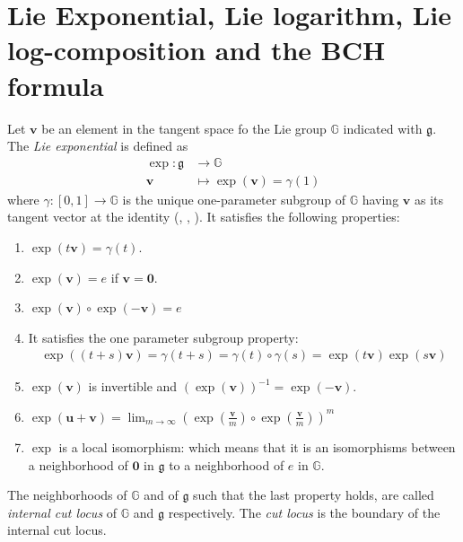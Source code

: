 \section{Lie Exponential, Lie logarithm, Lie log-composition and the BCH formula }\label{se:lie_exp_log_comp_bch}
Let $\mathbf{v}$ be an element in the tangent space fo the Lie group $\mathbb{G}$ indicated with $\mathfrak{g}$.
The \emph{Lie exponential} is defined as 
\begin{align*}
\exp :  \mathfrak{g} & \longrightarrow  \mathbb{G}  \\
\mathbf{v} &\longmapsto  \exp(\mathbf{v} ) = \gamma(1) %
\end{align*}
where $\gamma: [0,1]\rightarrow \mathbb{G} $ is the unique one-parameter subgroup of $\mathbb{G}$ having $\mathbf{v}$ as its tangent vector at the identity (\cite{do1992riemannian}, \cite{ebin2006singularities}, \cite{Arsigny:MRM:06}).
It satisfies the following properties:
\begin{enumerate}
	\item $\exp(t\mathbf{v}) =\gamma(t) $.
	\item $\exp(\mathbf{v}) = e$ if $\mathbf{v} = \mathbf{0}$.
	\item $\exp(\mathbf{v})\circ \exp(\mathbf{-v})  = e$
	\item It satisfies the one parameter subgroup property:
	\begin{align*}
	\exp((t+s)\mathbf{v}) = \gamma(t+s) = \gamma(t)\circ \gamma(s) = \exp(t\mathbf{v})\exp(s\mathbf{v})
	\end{align*}
	\item $\exp(\mathbf{v})$ is invertible and $(\exp(\mathbf{v}))^{-1} = \exp(-\mathbf{v})$.
		\item  $\exp(\mathbf{u} + \mathbf{v}) =\lim_{m\rightarrow \infty} (\exp(\frac{\mathbf{v}}{m}) \circ\exp(\frac{\mathbf{v}}{m}))^{m}$
	\item $\exp$ is a local isomorphism: which means that it is an isomorphisms between a neighborhood of $\mathbf{0}$ in $\mathfrak{g}$ to a neighborhood of $e$ in $\mathbb{G}$.
\end{enumerate}
The neighborhoods of $\mathbb{G}$ and of $\mathfrak{g}$ such that the last property holds, are called \emph{internal cut locus} of $\mathbb{G}$ and $\mathfrak{g}$ respectively. The \emph{cut locus} is the boundary of the internal cut locus.


